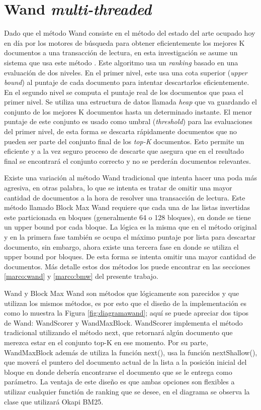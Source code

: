 \chapter{Wand \textit{multi-threaded}}
\label{cap:wand}

Dado que el método Wand \citep{Broder:2003} consiste en el método del estado del arte ocupado hoy en día por los motores de búsqueda para obtener eficientemente los mejores K documentos a una transacción de lectura, en esta investigación se asume un sistema que usa este método . Este algoritmo usa un \textit{ranking} basado en una evaluación de dos niveles. En el primer nivel, este usa una cota superior (\textit{upper bound}) al puntaje de cada documento para intentar descartarlos eficientemente. En el segundo nivel se computa el puntaje real de los documentos que pasa el primer nivel. Se utiliza una estructura de datos llamada \textit{heap} que va guardando el conjunto de los mejores K documentos hasta un determinado instante. El menor puntaje de este conjunto es usado como umbral (\textit{threshold}) para las evaluaciones del primer nivel, de esta forma se descarta rápidamente documentos que no pueden ser parte del conjunto final de los \textit{top-K} documentos. Esto permite un eficiente y a la vez seguro proceso de descarte que asegura que en el resultado final se encontrará el conjunto correcto y no se perderán documentos relevantes.

Existe una variación al método Wand tradicional que intenta hacer una poda más agresiva, en otras palabra, lo que se intenta es tratar de omitir una mayor cantidad de documentos a la hora de resolver una transacción de lectura. Este método llamado Block Max Wand requiere que cada una de las listas invertidas este particionada en bloques (generalmente 64 o 128 bloques), en donde se tiene un upper bound por cada bloque. La lógica es la misma que en el método original y en la primera fase también se ocupa el máximo puntaje por lista para descartar documento, sin embargo, ahora existe una tercera fase en donde se utiliza el upper bound por bloques. De esta forma se intenta omitir una mayor cantidad de documentos. Más detalle estos dos métodos los puede encontrar en las secciones \ref{marco:wand} y \ref{marco:bmw} del presente trabajo.

Wand y Block Max Wand son métodos que lógicamente son parecidos y que utilizan los mismos métodos, es por esto que el diseño de la implementación es como lo muestra la Figura \ref{fig:diagramawand}; aquí se puede apreciar dos tipos de Wand: WandScorer y WandMaxBlock. WandScorer implementa el método tradicional utilizando el método next, que retornará algún documento que merezca estar en el conjunto top-K en ese momento. Por su parte, WandMaxBlock además de utiliza la función next(), usa la función nextShallow(), que moverá el puntero del documento actual de la lista a la posición inicial del bloque en donde debería encontrarse el documento que se le entrega como parámetro. 
La ventaja de este diseño es que ambas opciones son flexibles a utilizar cualquier functión de ranking que se desee, en el diagrama se observa la clase que utilizará Okapi BM25. 

